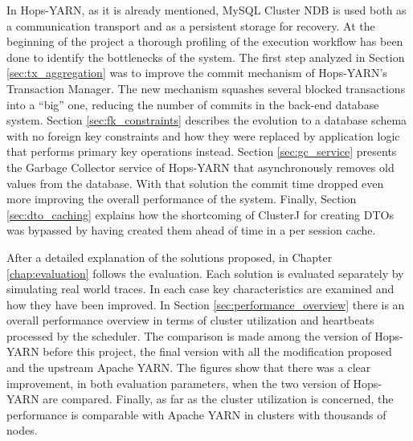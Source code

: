 In Hops-YARN, as it is already mentioned, MySQL Cluster NDB is used
both as a communication transport and as a persistent storage for
recovery. At the beginning of the project a thorough profiling of the
execution workflow has been done to identify the bottlenecks of the
system. The first step analyzed in Section \ref{sec:tx_aggregation}
was to improve the commit mechanism of Hops-YARN's Transaction
Manager. The new mechanism squashes several blocked transactions into
a ``big'' one, reducing the number of commits in the back-end database
system. Section \ref{sec:fk_constraints} describes the evolution to a
database schema with no foreign key constraints and how they were
replaced by application logic that performs primary key operations instead.
Section \ref{sec:gc_service} presents the Garbage Collector
service of Hops-YARN that asynchronously removes old values from the
database. With that solution the commit time dropped even more improving
the overall performance of the system. Finally, Section
\ref{sec:dto_caching} explains how the shortcoming of ClusterJ for
creating DTOs was bypassed by having created them ahead of time in a
per session cache.

After a detailed explanation of the solutions proposed, in Chapter
\ref{chap:evaluation} follows the evaluation. Each solution is
evaluated separately by simulating real world traces. In each case key
characteristics are examined and how they have been improved. In
Section \ref{sec:performance_overview} there is an overall performance
overview in terms of cluster utilization and heartbeats processed by
the scheduler. The comparison is made among the version of Hops-YARN
before this project, the final version with all the modification
proposed and the upstream Apache YARN. The figures show that there was
a clear improvement, in both evaluation parameters, when the two
version of Hops-YARN are compared. Finally, as far as the cluster
utilization is concerned, the performance is comparable with Apache
YARN in clusters with thousands of nodes.